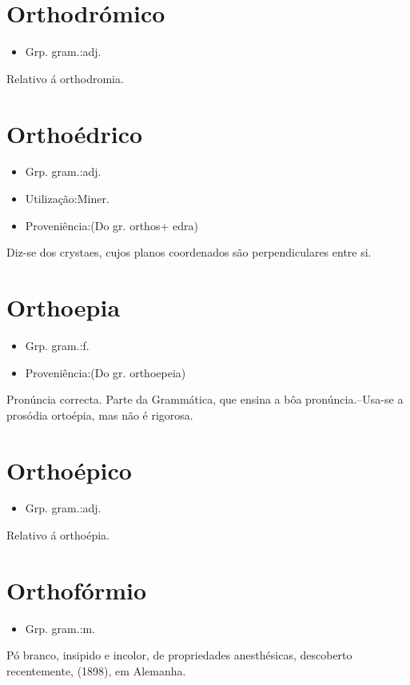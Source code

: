 \section{Orthodrómico}
\begin{itemize}
\item {Grp. gram.:adj.}
\end{itemize}
Relativo á orthodromia.
\section{Orthoédrico}
\begin{itemize}
\item {Grp. gram.:adj.}
\end{itemize}
\begin{itemize}
\item {Utilização:Miner.}
\end{itemize}
\begin{itemize}
\item {Proveniência:(Do gr. \textunderscore orthos\textunderscore  + \textunderscore edra\textunderscore )}
\end{itemize}
Diz-se dos crystaes, cujos planos coordenados são perpendiculares entre si.
\section{Orthoepia}
\begin{itemize}
\item {Grp. gram.:f.}
\end{itemize}
\begin{itemize}
\item {Proveniência:(Do gr. \textunderscore orthoepeia\textunderscore )}
\end{itemize}
Pronúncia correcta.
Parte da Grammática, que ensina a bôa pronúncia.--Usa-se a prosódia \textunderscore ortoépia\textunderscore , mas não é rigorosa.
\section{Orthoépico}
\begin{itemize}
\item {Grp. gram.:adj.}
\end{itemize}
Relativo á orthoépia.
\section{Orthofórmio}
\begin{itemize}
\item {Grp. gram.:m.}
\end{itemize}
Pó branco, insipido e incolor, de propriedades anesthésicas, descoberto recentemente, (1898), em Alemanha.
